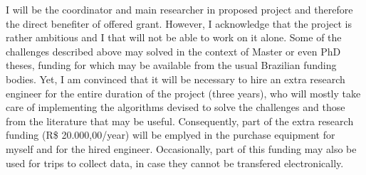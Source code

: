 I will be the coordinator and main researcher in proposed project and therefore the direct benefiter of offered grant. However, I acknowledge that the project is rather ambitious and I that will not be able to work on it alone. Some of the challenges described above may solved in the context of Master or even PhD theses, funding for which may be available from the usual Brazilian funding bodies. Yet, I am convinced that it will be necessary to hire an extra research engineer for the entire duration of the project (three years), who will mostly take care of implementing the algorithms devised to solve the challenges and those from the literature that may be useful. Consequently, part of the extra research funding (R\$ 20.000,00/year) will be emplyed in the purchase equipment for myself and for the hired engineer. Occasionally, part of this funding may also be used for trips to collect data, in case they cannot be transfered electronically.
